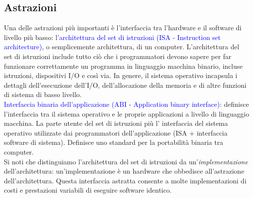 \documentclass[12pt,a4paper]{article}
\begin{document}
\subsection{Astrazioni}
Una delle astrazioni più importanti è l'interfaccia tra l'hardware e il software di livello più basso: l'\textcolor{blue}{architettura del set di istruzioni (ISA - Instruction set architecture)}, o semplicemente architettura, di un computer. L'architettura del set di istruzioni include tutto ciò che i programmatori devono sapere per far funzionare correttamente un programma in linguaggio macchina binario, incluse istruzioni, dispositivi I/O e così via. In genere, il sistema operativo incapsula i dettagli dell'esecuzione dell'I/O, dell'allocazione della memoria e di altre funzioni di sistema di basso livello.\\
\textcolor{blue}{Interfaccia binaria dell'applicazione (ABI - Application binary interface)}: definisce l'interfaccia tra il sistema operativo e le proprie applicazioni a livello di linguaggio macchina. La parte utente del set di istruzioni più l' interfaccia del sistema operativo utilizzate dai programmatori dell'applicazione (ISA + interfaccia software di sistema). Definisce uno standard per la portabilità binaria tra computer.\\
Si noti che distinguiamo l'architettura del set di istruzioni da un'\textsl{implementazione} dell'architettura: un'implementazione è un hardware che obbedisce all'astrazione dell'architettura. Questa interfaccia astratta consente a molte implementazioni di costi e prestazioni variabili di eseguire software identico.
\end{document}
